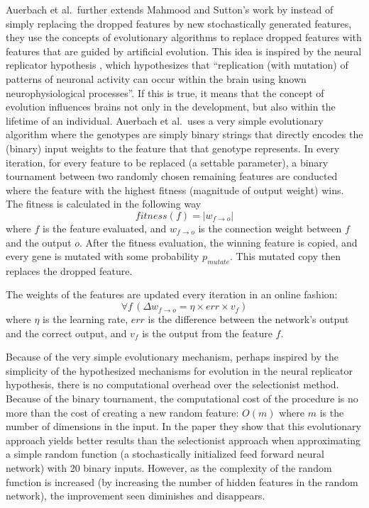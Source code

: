 \documentclass[a4paper]{article}
\numberwithin{equation}{section}
\begin{document}
Auerbach et al.\ further extends Mahmood and Sutton's work by instead of simply
replacing the dropped features by new stochastically generated features, they
use the concepts of evolutionary algorithms to replace dropped features with
features that are guided by artificial evolution. This idea is inspired by the
neural replicator hypothesis \cite{fernando2010neuronal}, which hypothesizes
that ``replication (with mutation) of patterns of neuronal activity can occur
within the brain using known neurophysiological processes''. If this is true, it
means that the concept of evolution influences brains not only in the
development, but also within the lifetime of an individual. Auerbach et al.\
uses a very simple evolutionary algorithm where the genotypes are simply binary
strings that directly encodes the (binary) input weights to the feature that
that genotype represents. In every iteration, for every feature to be replaced
(a settable parameter), a binary tournament between two randomly chosen
remaining features are conducted where the feature with the highest fitness
(magnitude of output weight) wins. The fitness is calculated in the following
way
\begin{equation}
    fitness(f) = \lvert w_{f \rightarrow o} \rvert
    \label{eq:oeelmfitness}
\end{equation}
where $f$ is the feature evaluated, and $w_{f \rightarrow o}$ is the connection
weight between $f$ and the output $o$. After the fitness evaluation, the
winning feature is copied, and every gene is mutated with some probability
$p_{mutate}$. This mutated copy then replaces the dropped feature.

The weights of the features are updated every iteration in an online fashion:
\begin{equation}
    \forall f \,(\Delta w_{f \rightarrow o} = \eta \times err \times v_f)
    \label{eq:oeelmdeltaw}
\end{equation}
where $\eta$ is the learning rate, $err$ is the difference between the network's
output and the correct output, and $v_f$ is the output from the feature $f$.

Because of the very simple evolutionary mechanism, perhaps inspired by the
simplicity of the hypothesized mechanisms for evolution in the neural replicator
hypothesis, there is no computational overhead over the selectionist method.
Because of the binary tournament, the computational cost of the procedure is no
more than the cost of creating a new random feature: $O(m)$ where $m$ is the
number of dimensions in the input. In the paper they show that this evolutionary
approach yields better results than the selectionist approach when approximating
a simple random function (a stochastically initialized feed forward neural
network) with 20 binary inputs. However, as the complexity of the random
function is increased (by increasing the number of hidden features in the random
network), the improvement seen diminishes and disappears.
\end{document}
